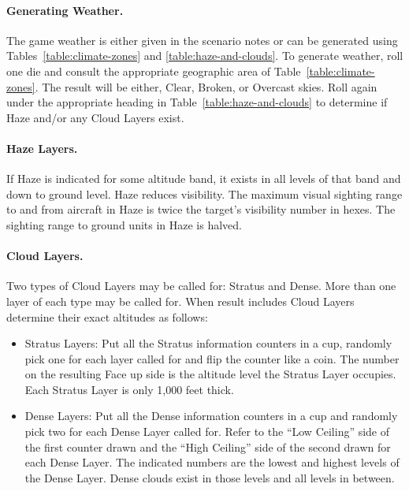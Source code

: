 \begin{advancedrules}
{\paragraph{Generating Weather.} The game weather is either given in the scenario notes or can be generated using Tables~\ref{table:climate-zones} and \ref{table:haze-and-clouds}. To generate weather, roll one die and consult the appropriate geographic area of Table~\ref{table:climate-zones}. The result will be either, Clear, Broken, or Overcast skies. Roll again under the appropriate heading in Table~\ref{table:haze-and-clouds} to determine if Haze and/or any Cloud Layers exist.
}

\paragraph{Haze Layers.} If Haze is indicated for some altitude band, it exists in all levels of that band and down to ground level. Haze reduces visibility. The maximum visual sighting range to and from aircraft in Haze is twice the target's visibility number in hexes. The sighting range to ground units in Haze is halved.

\paragraph{Cloud Layers.} Two types of Cloud Layers may be called for: Stratus and Dense. More than one layer of each type may be called for. When  result includes Cloud Layers determine their exact altitudes as follows:

\begin{itemize}
    \item Stratus Layers: Put all the Stratus information counters in a cup, randomly pick one for each layer called for and flip the counter like a coin. The number on the resulting Face up side is the altitude level the Stratus Layer occupies. Each Stratus Layer is only 1,000 feet thick.

    \item Dense Layers: Put all the Dense information counters in a cup and randomly pick two for each Dense Layer called for. Refer to the “Low Ceiling” side of the first counter drawn and the “High Ceiling” side of the second drawn for each Dense Layer. The indicated numbers are the lowest and highest levels of the Dense Layer. Dense clouds exist in those levels and all levels in between.   
\end{itemize}



\end{advancedrules}
